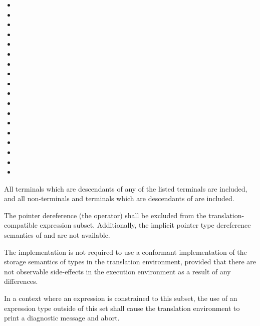 \begin{minipage}[t][7cm][b]{\textwidth}
\begin{multicols}{2}
\begin{itemize}
\item {}
\item {}
\item {}
\item {}
\item {}
\item {}
\item {}
\item {}
\item {}
\item {}
\item {}
\item {}
\item {}
\item {}
\item {}
\item {}
\item {}
\item {}
\end{itemize}
\end{multicols}
\end{minipage}

\vspace{0.25cm}
\specsubitem
All terminals which are descendants of any of the listed terminals are
included, and all non-terminals and terminals which are descendants of
 are included.

\specsubitem
The pointer dereference  (the \terminal{*}
operator) shall be excluded from the translation-compatible expression subset.
Additionally, the implicit pointer type dereference semantics of
 and  are
not available.

\specsubitem
The implementation is not required to use a conformant implementation of the
storage semantics of types in the translation environment, provided that there
are not observable side-effects in the execution environment as a result of any
differences.

\specsubitem
In a context where an expression is constrained to this subset, the use of an
expression type outside of this set shall cause the translation environment to
print a diagnostic message and abort.
